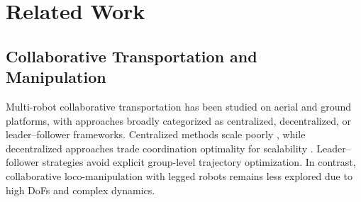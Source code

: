 \section{Related Work}
\label{sec:related_work}
\subsection{Collaborative Transportation and Manipulation}
Multi-robot collaborative transportation has been studied on aerial and ground platforms, with approaches broadly categorized as centralized, decentralized, or leader–follower frameworks. Centralized methods scale poorly \cite{nikou2017nonlinear,sun2025agile}, while decentralized approaches trade coordination optimality for scalability \cite{khatib1996coordination,verginis2018communication,culbertson2018decentralized}. Leader–follower strategies \cite{farivarnejad2022multirobot,sugar2002control} avoid explicit group-level trajectory optimization.
In contrast, collaborative loco-manipulation with legged robots remains less explored due to high DoFs and complex dynamics.%

